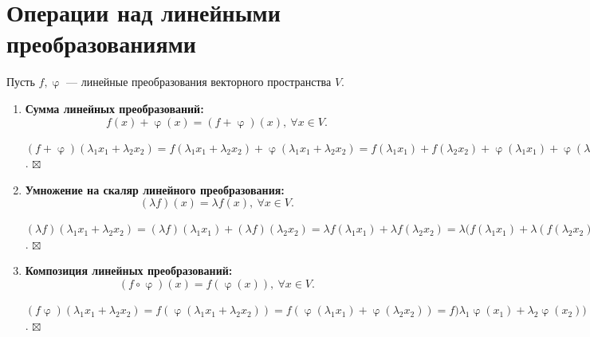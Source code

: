 \documentclass[a4paper, 12pt]{article}
\newenvironment{Proof}
{\par\noindent{$\blacklozenge$}}
{\hfill$\scriptstyle\boxtimes$}
\renewcommand{\varphi}{\upvarphi}
\begin{document}
\section{Операции над линейными преобразованиями}
Пусть $f, \varphi$ --- линейные преобразования векторного пространства $V$.
\begin{enumerate}
    \item \textbf{Сумма линейных преобразований:} $$f(x) + \varphi(x) = (f+\varphi)(x),\ \forall x \in V.$$
    \begin{Proof}
    	$(f+\varphi)(\lambda_1 x_1 + \lambda_2 x_2)=f(\lambda_1 x_1 + \lambda_2 x_2) + \varphi(\lambda_1 x_1 + \lambda_2 x_2)=f(\lambda_1 x_1) + f(\lambda_2 x_2) + \varphi(\lambda_1 x_1) + \varphi(\lambda_2 x_2) = \lambda_1f(x_1)+\lambda_2f(x_2)+\lambda_1\varphi(x_1)+\lambda_2\varphi(x_2)=\lambda_1(f(x_1)+\varphi(x_1))+\lambda_2(f(x_2)+\varphi(x_2))=\lambda_1(f+\varphi)(x_1)+\lambda_2(f+\varphi)(x_2)$.
    \end{Proof} 
    \item \textbf{Умножение на скаляр линейного преобразования:} $$(\lambda f)(x) =  \lambda f(x),\ \forall x \in V.$$
    \begin{Proof}
    	$(\lambda f)(\lambda_1 x_1 + \lambda_2 x_2)=(\lambda f)(\lambda_1 x_1)+(\lambda f)(\lambda_2 x_2)=\lambda f(\lambda_1 x_1)+\lambda f(\lambda_2 x_2)=\lambda(f(\lambda_1 x_1)+\lambda(f(\lambda_2 x_2))=\lambda f(\lambda_1x_1+\lambda_2x_2)$.
    \end{Proof} 
    \item \textbf{Композиция линейных преобразований:} $$(f\circ \varphi)(x) = f(\varphi(x)),\ \forall x \in V.$$
    \begin{Proof}
    	$(f\varphi)(\lambda_1x_1+\lambda_2x_2)=f(\varphi(\lambda_1x_1+\lambda_2x_2))=f(\varphi(\lambda_1x_1)+\varphi(\lambda_2x_2))=f)\lambda_1\varphi(x_1)+\lambda_2\varphi(x_2))=\lambda_1f(\varphi(x_1))+\lambda_2f(\varphi(x_2))=\lambda_1(f\varphi)(x_1)+\lambda_2(f\varphi)(x_2)$.
    \end{Proof} 
\end{enumerate}
\end{document}
